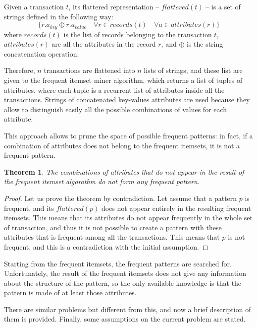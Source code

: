 \documentclass{acm_proc_article-sp-sigmod09}
\begin{document}
\begin{definition}
Given a transaction $t$, its flattered representation -- $flattered(t)$ -- is a set of strings defined in the following way:
\[
\{r.a_{key} \oplus r.a_{value} \quad \forall r \in records(t) \quad \forall a \in attributes(r) \}
\]
where $records(t)$ is the list of records belonging to the transaction $t$, $attributes(r)$ are all the attributes in the record $r$, and $\oplus$ is the string concatenation operation.
\end{definition}

Therefore, $n$ transactions are flattened into $n$ lists of strings, and these list are given to the frequent itemset miner algorithm, which returns a list of tuples of attributes, where each tuple is a recurrent list of attributes inside all the transactions. Strings of concatenated key-values attributes are used because they allow to distinguish easily all the possible combinations of values for each attribute.

This approach allows to prune the space of possible frequent patterns: in fact, if a combination of attributes does not belong to the frequent itemsets, it is not a frequent pattern.

\newtheorem{theorem}{Theorem}
\begin{theorem}
The combinations of attributes that do not appear in the result of the frequent itemset algorothm do not form any frequent pattern.
\end{theorem}

\begin{proof}
Let us prove the theorem by contradiction. Let assume that a pattern $p$ is frequent, and its $flattered(p)$ does not appear entirely in the resulting frequent itemsets. This means that its attributes do not appear frequently in the whole set of transaction, and thus it is not possible to create a pattern with these attributes that is frequent among all the transactions. This means that $p$ is not frequent, and this is a contradiction with the initial assumption.
\end{proof}

Starting from the frequent itemsets, the frequent patterns are searched for. Unfortunately, the result of the frequent itemsets does not give any information about the structure of the pattern, so the only available knowledge is that the pattern is made of at least those attributes.

There are similar problems but different from this, and now a brief description of them is provided. Finally, some assumptions on the current problem are stated.
\end{document}
